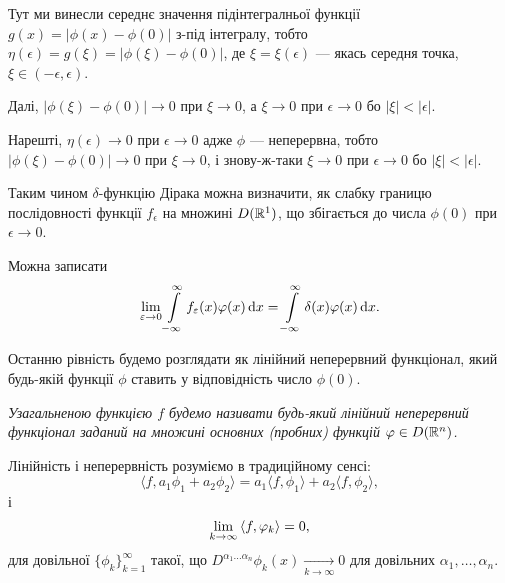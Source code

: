 \begin{remark}
	Тут ми винесли середнє значення підінтегралньої функції $g(x) = |\phi(x) - \phi(0)|$ з-під інтегралу, тобто $\eta(\epsilon) = g(\xi) = |\phi(\xi) - \phi(0)|$, де $\xi = \xi(\epsilon)$ --- якась середня точка, $\xi \in (-\epsilon, \epsilon)$. \medskip

	Далі, $|\phi(\xi) - \phi(0)| \to 0$ при $\xi \to 0$, а $\xi \to 0$ при $\epsilon \to 0$ бо $|\xi| < |\epsilon|$. \medskip

	Нарешті, $\eta(\epsilon) \to 0$ при $\epsilon \to 0$ адже $\phi$ --- неперервна, тобто $|\phi(\xi) - \phi(0)| \to 0$ при $\xi \to 0$, і знову-ж-таки $\xi \to 0$ при $\epsilon \to 0$ бо $|\xi| < |\epsilon|$.
\end{remark}

Таким чином $\delta$-функцію Дірака можна визначити, як слабку границю послідовності функції $f_\epsilon$ на множині $D(\mathbb{R}^1)$, що збігається до числа $\phi(0)$ при $\epsilon \to 0$. \medskip

Можна записати 
\begin{equation}
	\displaystyle\lim\limits_{\varepsilon \to 0} \displaystyle\int\limits_{-\infty}^\infty f_\varepsilon(x) \varphi(x) \mathop{}\!\mathrm{d} x = \displaystyle\int\limits_{-\infty}^\infty \delta(x) \varphi(x) \mathop{}\!\mathrm{d} x.
\end{equation}

Останню рівність будемо розглядати як лінійний неперервний функціонал, який будь-якій функції $\phi$ ставить у відповідність число $\phi(0)$.

\begin{definition}
	\it{Узагальненою функцією} $f$ будемо називати будь-який лінійний неперервний функціонал   заданий на множині основних (пробних) функцій $\varphi \in D(\mathbb{R}^n)$.
\end{definition}

\begin{remark}
	Лінійність і неперервність розуміємо в традиційному сенсі:
	\begin{equation}
		\langle f, a_1 \phi_1 + a_2 \phi_2 \rangle = a_1 \langle f, \phi_1 \rangle + a_2 \langle f, \phi_2 \rangle,
	\end{equation}
	і
	\begin{equation}
		\Lim_{k \to \infty} \langle f, \phi_k \rangle = 0,
	\end{equation}
	для довільної $\{\phi_k\}_{k = 1}^\infty$ такої, що $D^{\alpha_1 \ldots \alpha_n} \phi_k(x) \xrightarrow[k \to \infty]{} 0$ для довільних $\alpha_1, \ldots, \alpha_n$.
\end{remark}

